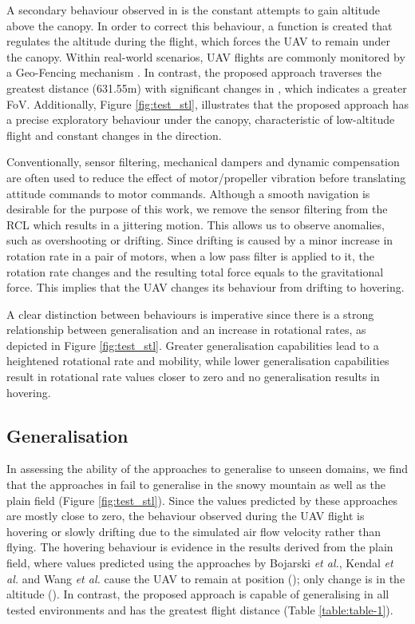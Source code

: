 \documentclass[letterpaper, 10 pt, journal, twoside]{IEEEtran}
\newcommand{\etal}{\emph{et al.}}
\begin{document}
A secondary behaviour observed in \cite{bojarski2016end} is the constant attempts to gain altitude above the canopy. In order to correct this behaviour, a function is created that regulates the altitude during the flight, which forces the UAV to remain under the canopy. Within real-world scenarios, UAV flights are commonly monitored by a Geo-Fencing mechanism \cite{pratyusha2013geo}. In contrast, the proposed approach traverses the greatest distance (631.55m) with significant changes in , which indicates a greater FoV. Additionally, Figure \ref{fig:test_stl}, illustrates that the proposed approach has a precise exploratory behaviour under the canopy, characteristic of low-altitude flight and constant changes in the  direction.  

Conventionally, sensor filtering, mechanical dampers and dynamic  compensation are often used to reduce the effect of motor/propeller vibration before translating attitude commands to motor commands. Although a smooth navigation is desirable for the purpose of this work, we remove the sensor filtering from the RCL which results in a jittering motion. This allows us to observe anomalies, such as overshooting or drifting. Since drifting is caused by a minor increase in rotation rate in a pair of motors, when a low pass filter is applied to it, the rotation rate changes and the resulting total force equals to the gravitational force. This implies that the UAV changes its behaviour from drifting to hovering.

A clear distinction between behaviours is imperative since there is a strong relationship between generalisation and an increase in rotational rates, as depicted in Figure \ref{fig:test_stl}. Greater generalisation capabilities lead to a heightened rotational rate and mobility, while lower generalisation capabilities result in rotational rate values closer to zero and no generalisation results in hovering.

 
\subsection{Generalisation} 
 
In assessing the ability of the approaches to generalise to unseen domains, we find that the approaches in \cite{bojarski2016end, kendall2015posenet, wang2017deepvo} fail to generalise in the snowy mountain as well as the plain field (Figure \ref{fig:test_stl}). Since the values predicted by these approaches are mostly close to zero, the behaviour observed during the UAV flight is hovering or slowly drifting due to the simulated air flow velocity rather than flying. The hovering behaviour is evidence in the results derived from the plain field, where values predicted using the approaches by Bojarski \etal \cite{bojarski2016end}, Kendal \etal \cite{kendall2015posenet} and Wang \etal \cite{wang2017deepvo} cause the UAV to remain at position (); only change is in the altitude (). In contrast, the proposed approach is capable of generalising in all tested environments and has the greatest flight distance (Table \ref{table:table-1}).
\end{document}
